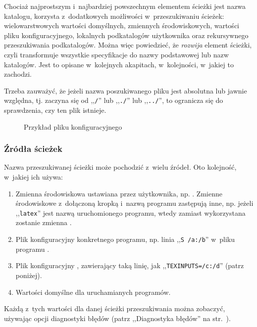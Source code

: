 \documentclass{article}
\renewcommand{\samp}[1]{,,\texttt{#1}''}  %
\begin{document}
Chociaż najprostszym i~najbardziej powszechnym elementem ścieżki jest
nazwa katalogu, \KPS{} korzysta z~dodatkowych możliwości w~przeszukiwaniu
ścieżek:
wielowarstwowych wartości domyślnych, zmiennych środowiskowych, wartości
pliku konfiguracyjnego, lokalnych
podkatalogów użytkownika oraz rekursywnego przeszukiwania podkatalogów.
Można więc powiedzieć, że \KPS{} \emph{rozwija} element ścieżki, czyli
transformuje wszystkie specyfikacje do nazwy podstawowej lub nazw katalogów.
Jest to opisane w~kolejnych akapitach, w~kolejności, w~jakiej to zachodzi.

Trzeba zauważyć, że jeżeli nazwa poszukiwanego pliku jest
absolutna lub jawnie względna, tj. zaczyna się  od \samp{/} lub \samp{./}
lub \samp{../}, to \KPS{} ogranicza się  do sprawdzenia, czy ten plik istnieje.

\ifSingleColumn
\else
\begin{figure*}

\setlength{\abovecaptionskip}{0pt}
  \caption{Przykład pliku konfiguracyjnego}
  \label{fig:config-sample}
\end{figure*}
\fi
\subsubsection{Źródła ścieżek}
\label{Path-sources}

Nazwa przeszukiwanej ścieżki może pochodzić z~wielu źródeł.
Oto kolejność, w~jakiej \KPS{} ich używa:

\begin{enumerate}
\item
  Zmienna środowiskowa ustawiana przez użytkownika, np.
  \@.
  Zmienne środowiskowe z~dołączoną kropką i~nazwą programu zastępują inne,
  np. jeżeli \samp{latex} jest nazwą uruchomionego programu, wtedy zamiast
   wykorzystana zostanie zmienna .
\item
  Plik konfiguracyjny konkretnego programu, np. linia ,,\texttt{S /a:/b}''
  w~pliku  programu .
\item   Plik konfiguracyjny \KPS{} , zawierający taką linię,
  jak \samp{TEXINPUTS=/c:/d} (patrz poniżej).
\item Wartości domyślne dla uruchamianych programów.
\end{enumerate}
\noindent Każdą z~tych wartości dla danej ścieżki przeszukiwania można
zobaczyć, używając opcji diagnostyki błędów (patrz ,,Diagnostyka błędów'' na
str.~\pageref{sec:debugging}).
\end{document}
